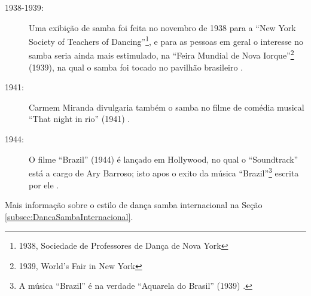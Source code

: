 \begin{description}
\item[1938-1939:] Uma exibição de samba foi feita no novembro de 1938
para a ``New York Society of Teachers of Dancing''\footnote{1938, Sociedade de Professores de Dança de Nova York},
e para as pessoas em geral o interesse no samba seria ainda mais estimulado,
na ``Feira Mundial de Nova Iorque''\footnote{1939, World’s Fair in New York} (1939), 
na qual o samba foi tocado no pavilhão brasileiro  \cite[pp. 45]{maxixe1915duqueEEUU:1}.

\item[1941:] Carmem Miranda divulgaria também o samba no
 filme de comédia musical ``That night in rio'' (1941) \cite[pp. 45]{maxixe1915duqueEEUU:1}.

\item[1944:] O filme ``Brazil'' (1944) é lançado em Hollywood,
no qual o ``Soundtrack'' está a cargo de Ary Barroso;
isto apos o exito da música ``Brazil''\footnote{A 
música ``Brazil'' é na verdade ``Aquarela do Brasil'' (1939) 
\cite[pp. 73]{diniz2006almanaque} \cite[pp. 128]{perna2002samba} \cite[pp. 77]{fenerick2005nem}.} 
escrita por ele \cite[pp. 45]{maxixe1915duqueEEUU:1}.

\end{description}

Mais informação sobre o estilo de dança samba internacional na Seção \ref{subsec:DancaSambaInternacional}.

          

